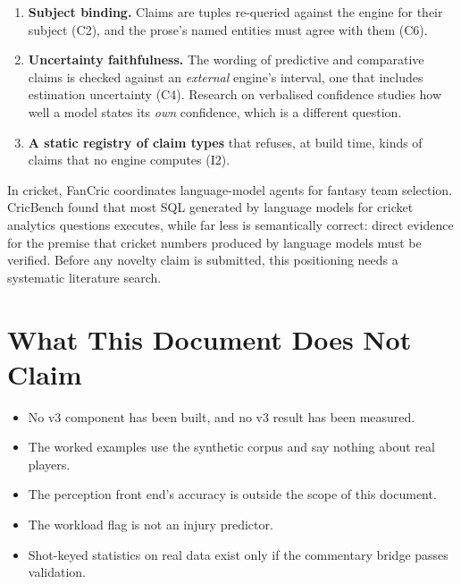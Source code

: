 \documentclass[11pt,a4paper]{article}
\begin{document}
\begin{enumerate}[nosep,leftmargin=1.6em]
\item \textbf{Subject binding.} Claims are tuples re-queried against the engine
  for their subject (C2), and the prose's named entities must agree with them
  (C6).
\item \textbf{Uncertainty faithfulness.} The wording of predictive and
  comparative claims is checked against an \emph{external} engine's interval,
  one that includes estimation uncertainty (C4). Research on verbalised
  confidence \cite{lin2022, wang2024} studies how well a model states its
  \emph{own} confidence, which is a different question.
\item \textbf{A static registry of claim types} that refuses, at build time,
  kinds of claims that no engine computes (I2).
\end{enumerate}

\noindent In cricket, FanCric \cite{fancric} coordinates language-model agents
for fantasy team selection. CricBench \cite{cricbench} found that most SQL
generated by language models for cricket analytics questions executes, while
far less is semantically correct: direct evidence for the premise that cricket
numbers produced by language models must be verified. Before any novelty claim
is submitted, this positioning needs a systematic literature search.

\section{What This Document Does Not Claim}

\begin{itemize}[nosep,leftmargin=1.6em]
\item No v3 component has been built, and no v3 result has been measured.
\item The worked examples use the synthetic corpus and say nothing about real
  players.
\item The perception front end's accuracy is outside the scope of this document.
\item The workload flag is not an injury predictor.
\item Shot-keyed statistics on real data exist only if the commentary bridge
  passes validation.
\end{itemize}
\end{document}
